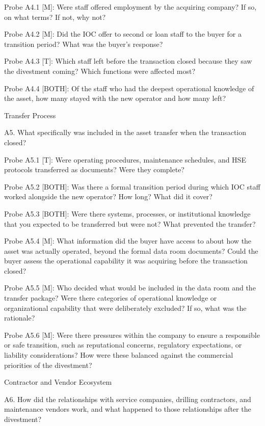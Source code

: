 \documentclass[twoside,fontset=lmodern]{mitthesis}
\begin{document}
Probe A4.1 {[}M{]}: Were staff offered employment by the acquiring
company? If so, on what terms? If not, why not?

Probe A4.2 {[}M{]}: Did the IOC offer to second or loan staff to the
buyer for a transition period? What was the buyer's response?

Probe A4.3 {[}T{]}: Which staff left before the transaction closed
because they saw the divestment coming? Which functions were affected
most?

Probe A4.4 {[}BOTH{]}: Of the staff who had the deepest operational
knowledge of the asset, how many stayed with the new operator and how
many left?

Transfer Process

A5. What specifically was included in the asset transfer when the
transaction closed?

Probe A5.1 {[}T{]}: Were operating procedures, maintenance schedules,
and HSE protocols transferred as documents? Were they complete?

Probe A5.2 {[}BOTH{]}: Was there a formal transition period during which
IOC staff worked alongside the new operator? How long? What did it
cover?

Probe A5.3 {[}BOTH{]}: Were there systems, processes, or institutional
knowledge that you expected to be transferred but were not? What
prevented the transfer?

Probe A5.4 {[}M{]}: What information did the buyer have access to about
how the asset was actually operated, beyond the formal data room
documents? Could the buyer assess the operational capability it was
acquiring before the transaction closed?

Probe A5.5 {[}M{]}: Who decided what would be included in the data room
and the transfer package? Were there categories of operational knowledge
or organizational capability that were deliberately excluded? If so,
what was the rationale?

Probe A5.6 {[}M{]}: Were there pressures within the company to ensure a
responsible or safe transition, such as reputational concerns,
regulatory expectations, or liability considerations? How were these
balanced against the commercial priorities of the divestment?

Contractor and Vendor Ecosystem

A6. How did the relationships with service companies, drilling
contractors, and maintenance vendors work, and what happened to those
relationships after the divestment?
\end{document}
